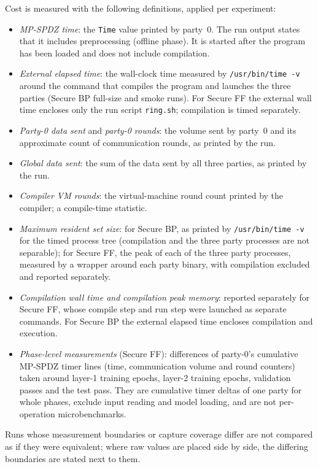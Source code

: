 Cost is measured with the following definitions, applied per experiment:
\begin{itemize}
  \item \emph{MP-SPDZ time}: the \texttt{Time} value printed by party~0. The run output states that it includes preprocessing (offline phase). It is started after the program has been loaded and does not include compilation.
  \item \emph{External elapsed time}: the wall-clock time measured by \texttt{/usr/bin/time -v} around the command that compiles the program and launches the three parties (Secure BP full-size and smoke runs). For Secure FF the external wall time encloses only the run script \texttt{ring.sh}; compilation is timed separately.
  \item \emph{Party-0 data sent} and \emph{party-0 rounds}: the volume sent by party~0 and its approximate count of communication rounds, as printed by the run.
  \item \emph{Global data sent}: the sum of the data sent by all three parties, as printed by the run.
  \item \emph{Compiler VM rounds}: the virtual-machine round count printed by the compiler; a compile-time statistic.
  \item \emph{Maximum resident set size}: for Secure BP, as printed by \texttt{/usr/bin/time -v} for the timed process tree (compilation and the three party processes are not separable); for Secure FF, the peak of each of the three party processes, measured by a wrapper around each party binary, with compilation excluded and reported separately.
  \item \emph{Compilation wall time and compilation peak memory}: reported separately for Secure FF, whose compile step and run step were launched as separate commands. For Secure BP the external elapsed time encloses compilation and execution.
  \item \emph{Phase-level measurements} (Secure FF): differences of party-0's cumulative MP-SPDZ timer lines (time, communication volume and round counters) taken around layer-1 training epochs, layer-2 training epochs, validation passes and the test pass. They are cumulative timer deltas of one party for whole phases, exclude input reading and model loading, and are not per-operation microbenchmarks.
\end{itemize}
Runs whose measurement boundaries or capture coverage differ are not compared as if they were equivalent; where raw values are placed side by side, the differing boundaries are stated next to them.

